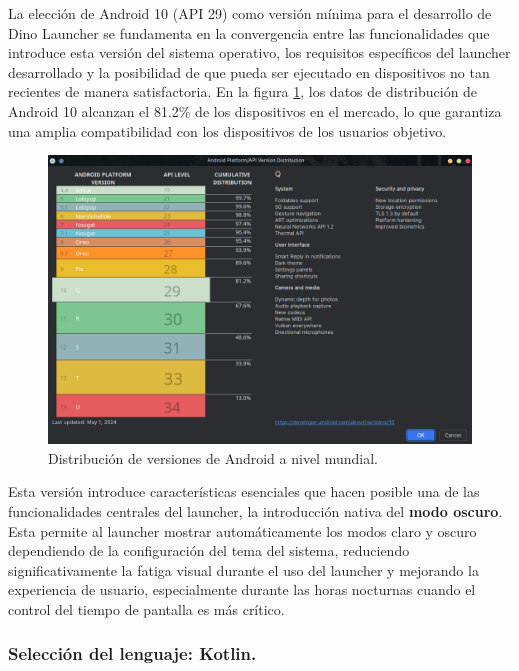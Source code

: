 La elección de Android 10 (API 29) como versión mínima para el desarrollo de Dino Launcher se fundamenta en la convergencia entre las funcionalidades que introduce esta versión del sistema operativo, los requisitos específicos del launcher desarrollado y la posibilidad de que pueda ser ejecutado en dispositivos no tan recientes de manera satisfactoria. En la figura \ref{fig:versiones_android}, los datos de distribución de Android 10 alcanzan el 81.2\% de los dispositivos en el mercado, lo que garantiza una amplia compatibilidad con los dispositivos de los usuarios objetivo. 

\begin{figure}[H]
\caption{Distribución de versiones de Android a nivel mundial. \cite{AndroidStudio}}
\label{fig:versiones_android}
\includegraphics[width=\textwidth]{Figuras/versiones_android.png}
\centering
\end{figure}

Esta versión introduce características esenciales que hacen posible una de las funcionalidades centrales del launcher, la introducción nativa del \textbf{modo oscuro}. Esta permite al launcher mostrar automáticamente los modos claro y oscuro dependiendo de la configuración del tema del sistema, reduciendo significativamente la fatiga visual durante el uso del launcher y mejorando la experiencia de usuario, especialmente durante las horas nocturnas cuando el control del tiempo de pantalla es más crítico. 

\subsubsection{Selección del lenguaje: Kotlin.}

